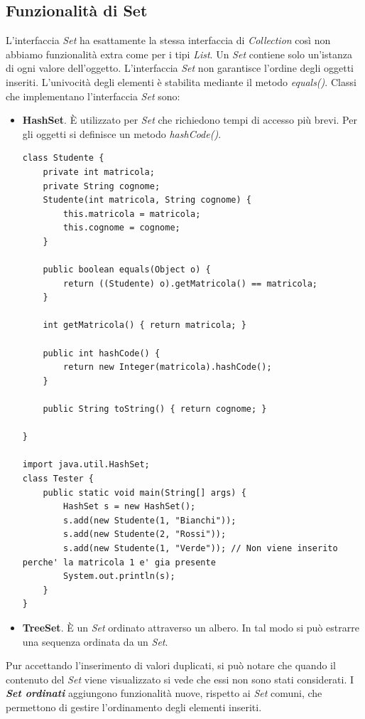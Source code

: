 \documentclass[12pt]{report}
\begin{document}
	\subsection{Funzionalità di Set} L'interfaccia \textit{Set} ha esattamente la stessa interfaccia di \textit{Collection} così non abbiamo funzionalità extra come per i tipi \textit{List}. Un \textit{Set} contiene solo un'istanza di ogni valore dell'oggetto. L'interfaccia \textit{Set} non garantisce l'ordine degli oggetti inseriti. L'univocità degli elementi è stabilita mediante il metodo \textit{equals()}. Classi che implementano l'interfaccia \textit{Set} sono:
	\begin{itemize}
		\item \textbf{HashSet}. È utilizzato per \textit{Set} che richiedono tempi di accesso più brevi. Per gli oggetti si definisce un metodo \textit{hashCode()}.
		\begin{lstlisting}[style=javastyle]
class Studente {
	private int matricola;
	private String cognome;
	Studente(int matricola, String cognome) {
		this.matricola = matricola;
		this.cognome = cognome;
	}

	public boolean equals(Object o) {
		return ((Studente) o).getMatricola() == matricola;
	}

	int getMatricola() { return matricola; }

	public int hashCode() {
		return new Integer(matricola).hashCode();
	}

	public String toString() { return cognome; }

}

import java.util.HashSet;
class Tester {
	public static void main(String[] args) {
		HashSet s = new HashSet();
		s.add(new Studente(1, "Bianchi"));
		s.add(new Studente(2, "Rossi"));
		s.add(new Studente(1, "Verde")); // Non viene inserito perche' la matricola 1 e' gia presente
		System.out.println(s);
	}
}
		\end{lstlisting}
			\item \textbf{TreeSet}. È un \textit{Set} ordinato attraverso un albero. In tal modo si può estrarre una sequenza ordinata da un \textit{Set}.
	\end{itemize}
	Pur accettando l'inserimento di valori duplicati, si può notare che quando il contenuto del \textit{Set} viene visualizzato si vede che essi non sono stati considerati. I \textbf{\textit{Set ordinati}} aggiungono funzionalità nuove, rispetto ai \textit{Set} comuni, che permettono di gestire l'ordinamento degli elementi inseriti.
\end{document}
